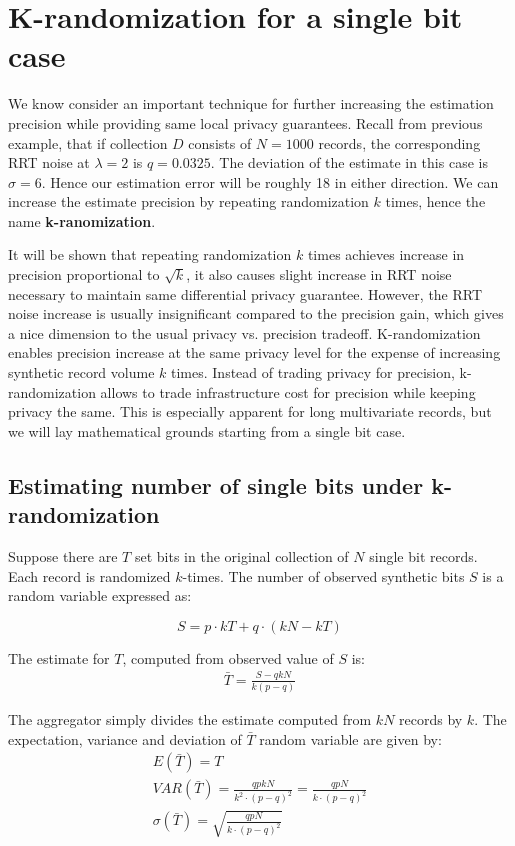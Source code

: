 \documentclass[11pt,draft]{article}
\begin{document}
\section{K-randomization for a single bit case}

We know consider an important technique for further increasing the estimation precision while providing same local privacy guarantees.  Recall from previous example, that if collection $D$ consists of $N=1000$ records, the corresponding RRT noise at $\lambda = 2$ is $q=0.0325$.  The deviation of the estimate in this case is $\sigma=6$.  Hence our estimation error will be roughly 18 in either direction.   We can increase the estimate precision by  repeating randomization $k$ times, hence the name  \textbf{k-ranomization}.  

It will be shown that repeating randomization $k$ times achieves increase in precision proportional to $\sqrt{k}$,  it also causes slight increase in RRT noise necessary to maintain same differential privacy guarantee.  However, the RRT noise increase is usually insignificant compared to the precision gain, which gives a nice dimension to the usual privacy vs. precision tradeoff.  K-randomization enables precision increase at the same privacy level for the expense of increasing synthetic record volume $k$ times.  Instead of trading privacy for precision, k-randomization allows to trade infrastructure cost for precision while keeping privacy the same.  This is especially apparent for long multivariate records,  but we will lay mathematical grounds starting from a single bit case.

\subsection{Estimating number of single bits under k-randomization}

Suppose there are $T$ set bits in the original collection of $N$ single bit records. Each record is randomized $k$-times.  The number of observed synthetic bits $S$ is a random variable expressed as:

\[ S = p \cdot kT + q \cdot (kN-kT) \]

The estimate for $T$, computed from observed value of $S$ is:
\begin{align}
\bar{T} = \frac{S-qkN}{k(p-q)}
\end{align}

The aggregator simply divides the estimate computed from $kN$ records by $k$.  The expectation, variance and deviation of $\bar{T}$ random variable are given by:
\begin{align}
E(\bar{T}) = T\\
VAR(\bar{T}) = \frac{qpkN}{k^2 \cdot (p-q)^2} = \frac{qpN}{k\cdot (p-q)^2}\\
\sigma(\bar{T}) = \sqrt{\frac{qpN}{k \cdot (p-q)^2}}
\end{align}
\end{document}
